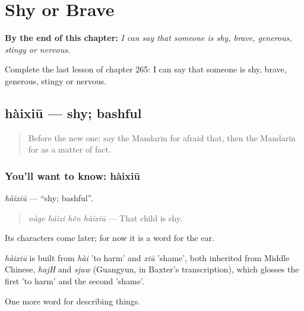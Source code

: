 
\chapter{Shy or Brave}
\label{ch:zh-shy-or-brave}

\begin{chapteropening}
\textbf{By the end of this chapter:} \emph{I can say that someone is shy, brave, generous, stingy or nervous.}

Complete the last lesson of chapter 265: I can say that someone is shy, brave, generous, stingy or nervous.
\end{chapteropening}

\section[hàixiū]{hàixiū — shy; bashful}

\label{lesson:ZH-C265-haixiu}



\begin{quote}
Before the new one: say the Mandarin for afraid that, then the Mandarin for as a matter of fact.
\end{quote}

\subsection*{You'll want to know: hàixiū}
\emph{hàixiū} — \textquotedblleft{}shy; bashful\textquotedblright{}.

\begin{quote}
\emph{nàge háizi hěn hàixiū} — That child is shy.
\end{quote}

Its characters come later; for now it is a word for the ear.

\begin{cousinweb}
\emph{hàixiū} is built from \emph{hài} 'to harm' and \emph{xiū} 'shame', both inherited from Middle Chinese, \emph{hajH} and \emph{sjuw} (Guangyun, in Baxter's transcription), which glosses the first 'to harm' and the second 'shame'.
\end{cousinweb}

\begin{grammarlens}[title={What you've built}]
One more word for describing things.
\end{grammarlens}

